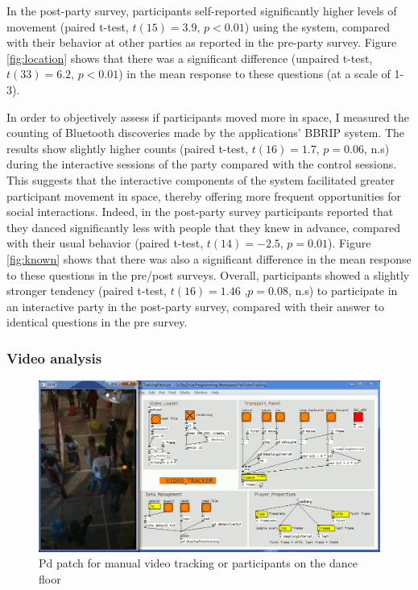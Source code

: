 \documentclass[a4paper,11pt]{article}
\begin{document}
{In the post-party survey, participants self-reported significantly higher levels of movement (paired t-test, $t(15)=3.9$, $p<0.01$) using the system, compared with their behavior at other parties as reported in the pre-party survey.
Figure \ref{fig:location} shows that there was a significant difference (unpaired t-test, $t(33)=6.2$, $p<0.01$) in the mean response to these questions (at a scale of 1-3).

In order to objectively assess if participants moved more in space, I measured the counting of Bluetooth discoveries made by the applications' BBRIP system.
The results show slightly higher counts (paired t-test, $t(16)=1.7$, $p=0.06$, n.s) during the interactive sessions of the party compared with the control sessions.
This suggests that the interactive components of the system facilitated greater participant movement in space, thereby offering more frequent opportunities for social interactions.
Indeed, in the post-party survey participants reported that they danced significantly less with people that they knew in advance, compared with their usual behavior (paired t-test, $t(14)=-2.5$, $p=0.01$).
Figure \ref{fig:known} shows that there was also a significant difference in the mean response to these questions in the pre/post surveys.
Overall, participants showed a slightly stronger tendency (paired t-test, $t(16)=1.46$ ,$p=0.08$, n.s) to participate in an interactive party in the post-party survey, compared with their answer to identical questions in the pre survey.

\subsubsection{Video analysis}\label{exp1:results:video}

\begin{figure}[!htb]
	\includegraphics[width=\linewidth]{tracking}
        \caption{Pd patch for manual video tracking or participants on the dance floor}\label{fig:tracking}
\end{figure}

}
\end{document}
